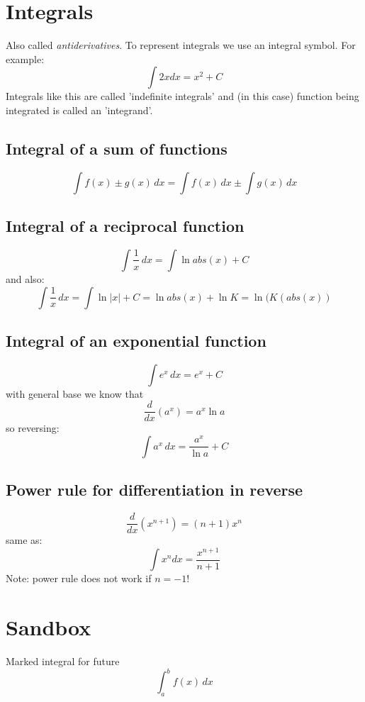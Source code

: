 \documentclass{article}
\begin{document}
\section{Integrals}
Also called \textit{antiderivatives}. To represent integrals we use an integral
symbol. For example:
\begin{equation}
  \int 2x dx = x^2 + C
\end{equation}
Integrals like this are called 'indefinite integrals' and (in this case)
function being integrated is called an 'integrand'.

\subsection{Integral of a sum of functions}
\begin{equation}
  \int f(x) \pm g(x) \, dx = \int f(x) \, dx \pm \int g(x) \, dx
\end{equation}

\subsection{Integral of a reciprocal function}
\begin{equation}
  \int \frac{1}{x} \, dx = \int \ln abs(x) + C
\end{equation}
and also:
\begin{equation}
  \int \frac{1}{x} \, dx = \int \ln|x| + C = \ln abs(x) + \ln K = \ln (K (abs(x))
\end{equation}

\subsection{Integral of an exponential function}
\begin{equation}
  \int e^x \, dx = e^x + C
\end{equation}
with general base we know that
\begin{equation}
  \frac{d}{dx} (a^x) = a^x \ln a
\end{equation}
so reversing:
\begin{equation}
  \int a^x \, dx = \frac{a^x}{\ln a} + C
\end{equation}

\subsection{Power rule for differentiation in reverse}
\begin{equation}
  \frac{d}{dx}(x^{n+1}) = (n+1)x^n
\end{equation}
same as:
\begin{equation}
  \int x^ndx = \frac{x^{n+1}}{n+1}
\end{equation}
Note: power rule does not work if $n=-1$!

\section{Sandbox}
Marked integral for future
\begin{equation}
  \int_{a}^{b} f(x) \, dx
\end{equation}
\end{document}
